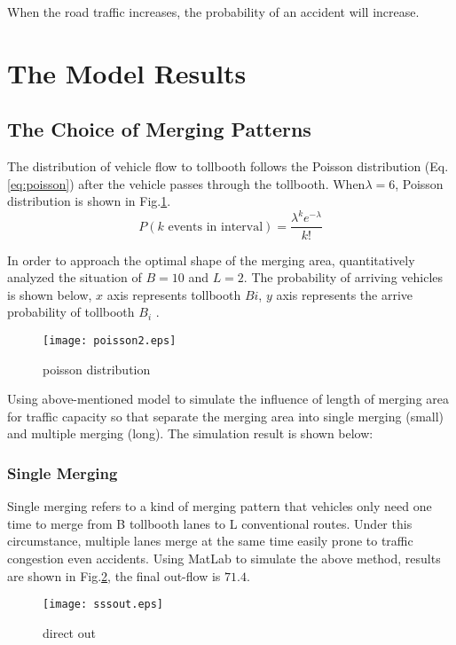 \documentclass{mcmthesis}
\begin{document}
When the road traffic increases, the probability of an accident will increase.

\section{The Model Results}
\subsection{The Choice of Merging Patterns}
The distribution of vehicle flow to tollbooth follows the Poisson distribution (Eq.\ref*{eq:poisson}) after the vehicle passes through the tollbooth. When$\lambda = 6$, Poisson distribution is shown in Fig.\ref{fig:poisson}.
\begin{equation}
	\label{eq:poisson}
	P(k \text{ events in interval})=\frac{\lambda^{k} e^{-\lambda}}{k!}
\end{equation}

In order to approach the optimal shape of the merging area, quantitatively analyzed the situation of $B = 10$ and $L = 2$. The probability of arriving vehicles is shown below, $x$ axis represents tollbooth $Bi$, $y$ axis represents the arrive probability of tollbooth $B_i$ .

\begin{figure}[!htbp]
	\small
	\centering
	\texttt{[image: poisson2.eps]}
	\caption{\label{fig:poisson}poisson distribution} 
\end{figure}

Using above-mentioned model to simulate the influence of length of merging area for traffic capacity so that separate the merging area into single merging (small) and  multiple merging (long). The simulation result is shown below: 
\subsubsection{Single Merging}
Single merging refers to a kind of merging pattern that vehicles only need one time to merge from B tollbooth lanes to L conventional routes. Under this circumstance, multiple lanes merge at the same time easily prone to traffic congestion even accidents. Using  MatLab to simulate the above method, results are shown in Fig.\ref{fig:direct_out}, the final out-flow is $71.4$.
\begin{figure}[!htbp]
	\small
	\centering
	\texttt{[image: sssout.eps]}
	\caption{\label{fig:direct_out}direct out} 
\end{figure}
\end{document}
